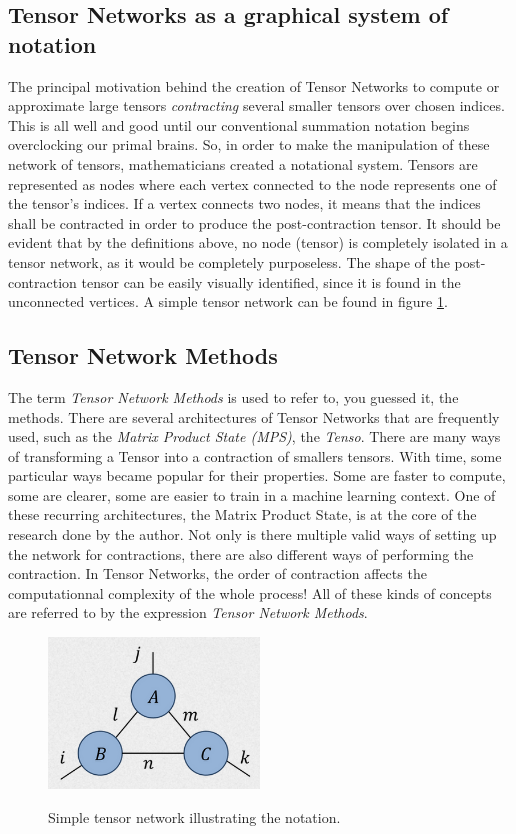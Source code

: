 \documentclass{article}
\theoremstyle{definition}
\theoremstyle{definition}
\begin{document}
\subsection{Tensor Networks as a graphical system of notation}
The principal motivation behind the creation of Tensor Networks to compute or approximate large tensors {\it contracting} several smaller tensors over chosen indices. 
This is all well and good until our conventional summation notation begins overclocking our primal brains.
So, in order to make the manipulation of these network of tensors, mathematicians created a notational system. 
Tensors are represented as nodes where each vertex connected to the node represents one of the tensor's indices. 
If a vertex connects two nodes, it means that the indices shall be contracted in order to produce the post-contraction tensor. 
It should be evident that by the definitions above, no node (tensor) is completely isolated in a tensor network, as it would be completely purposeless. 
The shape of the post-contraction tensor can be easily visually identified, since it is found in the unconnected vertices.
A simple tensor network can be found in figure \ref{fig:tensor_net}.

\subsection{Tensor Network Methods}
The term {\it Tensor Network Methods} is used to refer to, you guessed it, the methods.
There are several architectures of Tensor Networks that are frequently used, such as the {\it Matrix Product State (MPS)}, the {\it Tenso}.
There are many ways of transforming a Tensor into a contraction of smallers tensors. 
With time, some particular ways became popular for their properties. 
Some are faster to compute, some are clearer, some are easier to train in a machine learning context. 
One of these recurring architectures, the Matrix Product State, is at the core of the research done by the author.
Not only is there multiple valid ways of setting up the network for contractions, there are also different ways of performing the contraction.
In Tensor Networks, the order of contraction affects the computationnal complexity of the whole process!
All of these kinds of concepts are referred to by the expression \emph{Tensor Network Methods}.


\begin{figure}[h]
\centering
\caption{Simple tensor network illustrating the notation.}
\includegraphics[width=0.5\textwidth]{images/2023-03-21-10-22-39.png}
\label{fig:tensor_net}
\end{figure}
\end{document}
